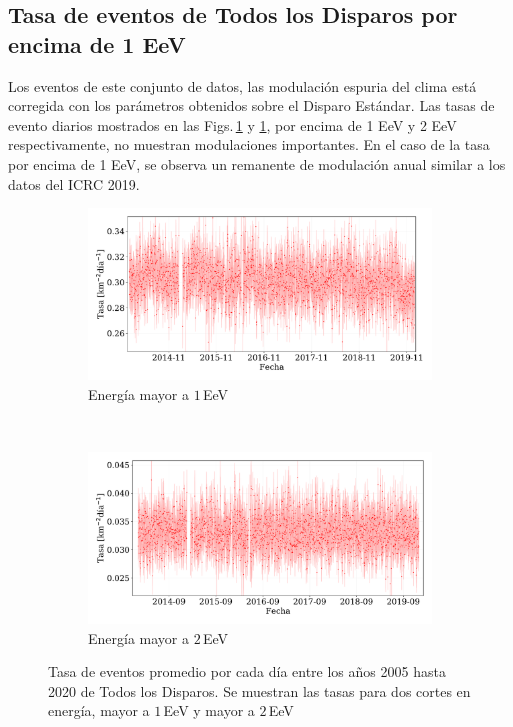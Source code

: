 \subsection{Tasa de eventos de Todos los Disparos por encima de 1 EeV}

Los eventos de este conjunto de datos, las modulación espuria del clima está corregida con los parámetros obtenidos sobre el Disparo Estándar. Las tasas de evento diarios mostrados en las Figs.\,\ref{fig:rate_ALL_1} y  \ref{fig:rate_ALL_1}, por encima de 1 EeV y 2 EeV respectivamente, no muestran modulaciones importantes. En el caso de la tasa por encima de 1 EeV, se observa un remanente de modulación anual similar a los datos del ICRC 2019. 



\begin{figure}[H]
  \centering
  \begin{subfigure}[b]{0.9\textwidth}
  \includegraphics[width=\textwidth]{../04_Clima/Graphs/rate_dayly/AllTriggers_1EeV_rate_v3.pdf}
  \caption{Energía mayor a $1\,$EeV}
  \label{fig:rate_ALL_1}
  \end{subfigure}\\
  \begin{subfigure}[b]{0.9\textwidth}
  \includegraphics[width=\textwidth]{../04_Clima/Graphs/rate_dayly/AllTriggers_2EeV_rate.pdf}
  \caption{ Energía mayor a $2\,$EeV}
  \label{fig:rate_ALL_2}
  \end{subfigure}%
  \caption{Tasa de eventos promedio por cada día entre los años 2005 hasta 2020 de Todos los Disparos. Se muestran las tasas para dos cortes en energía, mayor a $1\,$EeV y mayor a $2\,$EeV}\label{fig:rate_ALL}
\end{figure}


